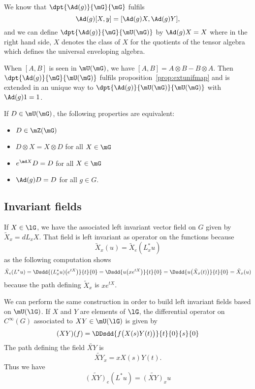 We know that $\dpt{ \Ad(g) }{ \mG }{ \mG }$ fulfils
\[
	\Ad(g)[X,y]=[  \Ad(g)X,\Ad(g)Y  ],
\]
and we can define $\dpt{ \Ad(g) }{ \mG }{ \mU(\mG) }$ by $\Ad(g)X=X$ where in the right hand side, $X$ denotes the class of $X$ for the quotients of the tensor algebra which defines the universal enveloping algebra.

When $[A,B]$ is seen in $\mU(\mG)$, we have $[A,B]=A\otimes B-B\otimes A$. Then $\dpt{ \Ad(g) }{ \mG }{ \mU(\mG) }$ fulfils proposition~\ref{prop:extunifmap} and is extended in an unique way to $\dpt{ \Ad(g) }{ \mU(\mG) }{ \mU(\mG) }$ with $\Ad(g)1=1$.

\begin{lemma}
	If $D\in\mU(\mG)$, the following properties are equivalent:
	\begin{itemize}
		\item $D\in\mZ(\mG)$
		\item $D\otimes X=X\otimes D$ for all $X\in \mG$
		\item $e^{\ad X}D=D$ for all $X\in\mG$
		\item $\Ad(g)D=D$ for all $g\in G$.
	\end{itemize}
	\label{lem:equivDAd}
\end{lemma}

\subsection{Invariant fields}

If $X\in\lG$, we have the associated left invariant vector field on $G$ given by $\tilde X_x=dL_xX$. That field is left invariant as operator on the functions because
\begin{equation}
	\tilde X_x(u)=\tilde X_e(L^*_xu)
\end{equation}
as the following computation shows
\begin{equation}
	\tilde X_e(L^*u)=\Dsdd{ (L_x^*u)\big(  e^{tX} \big) }{t}{0}
	=\Dsdd{ u\big( x e^{tX} \big) }{t}{0}
	=\Dsdd{ u\big( \tilde X_x(t) \big) }{t}{0}
	=\tilde X_x(u)
\end{equation}
because the path defining $\tilde X_x$ is $x e^{tX}$.

We can perform the same construction in order to build left invariant fields based on $\mU(\lG)$. If $X$ and $Y$ are elements of $\lG$, the  differential operator on $ C^{\infty}(G)$ associated to $XY\in\mU(\lG)$ is given by
\begin{equation}
	(XY)(f)=\DDsdd{ f\big( X(s)Y(t) \big) }{t}{0}{s}{0}
\end{equation}
The path defining the field $\widetilde{XY}$ is
\begin{equation}
	\widetilde{XY}_x=xX(s)Y(t).
\end{equation}
Thus we have
\begin{equation}        \label{EqInvarUgField}
	\widetilde{(XY)}_e(L^*u)=\widetilde{(XY)}_xu
\end{equation}

